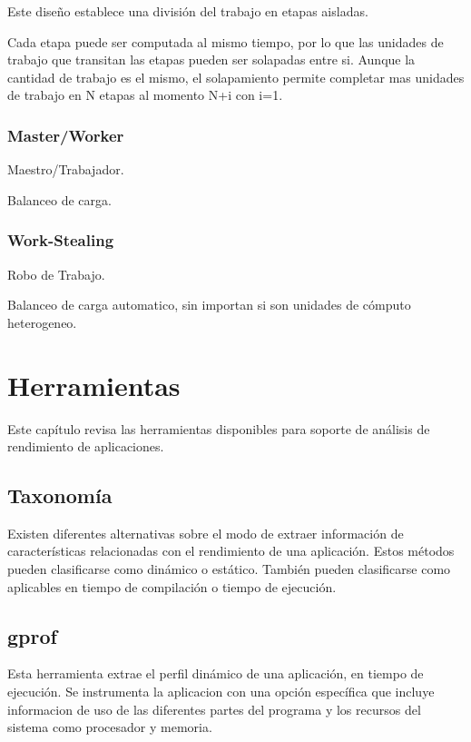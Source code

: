\documentclass[a4paper]{report}
\begin{document}
Este dise\~no establece una divisi\'on del trabajo en etapas aisladas.

Cada etapa puede ser computada al mismo tiempo, por lo que las unidades de trabajo que transitan las etapas pueden ser solapadas entre si.
Aunque la cantidad de trabajo es el mismo, el solapamiento permite completar mas unidades de trabajo en N etapas al momento N+i con i=1.

\subsection{Master/Worker}

Maestro/Trabajador.

Balanceo de carga.

\subsection{Work-Stealing}

Robo de Trabajo.

Balanceo de carga automatico, sin importan si son unidades de c\'omputo heterogeneo.

\chapter{Herramientas}

Este cap\'itulo revisa las herramientas disponibles para soporte de an\'alisis
de rendimiento de aplicaciones.

\section{Taxonom\'ia}

Existen diferentes alternativas sobre el modo de extraer informaci\'on de
caracter\'isticas relacionadas con el rendimiento de una aplicaci\'on.
Estos m\'etodos pueden clasificarse como din\'amico o est\'atico.
Tambi\'en pueden clasificarse como aplicables en tiempo de compilaci\'on o
tiempo de ejecuci\'on.


\section{gprof}

Esta herramienta extrae el perfil din\'amico de una aplicaci\'on, en tiempo
de ejecuci\'on. Se instrumenta la aplicacion con una opci\'on espec\'ifica que
incluye informacion de uso de las diferentes partes del programa y los
recursos del sistema como procesador y memoria.
\end{document}
